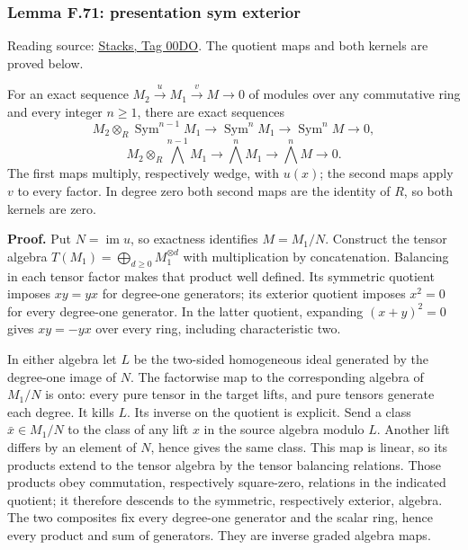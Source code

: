 \documentclass[11pt,a4paper,openany]{report}
\begin{document}
\label{AG-RG-S05-algebra-lemma-presentation-sym-exterior}

\subsubsection{Lemma F.71: presentation sym exterior}\label{AG-RG-S05-lemma-f.71-presentation-sym-exterior}

Reading source: \href{https://stacks.math.columbia.edu/tag/00DO}{Stacks, Tag 00DO}. The quotient maps and both kernels are proved below.

For an exact sequence \(M_2\xrightarrow{u}M_1\xrightarrow{v}M\to0\) of modules over any commutative ring and every integer \(n\geq1\), there are exact sequences \[
M_2\otimes_R\operatorname{Sym}^{n-1}M_1
\longrightarrow\operatorname{Sym}^nM_1
\longrightarrow\operatorname{Sym}^nM\longrightarrow0,
\] \[
M_2\otimes_R\bigwedge^{n-1}M_1
\longrightarrow\bigwedge^nM_1
\longrightarrow\bigwedge^nM\longrightarrow0.
\] The first maps multiply, respectively wedge, with \(u(x)\); the second maps apply \(v\) to every factor. In degree zero both second maps are the identity of \(R\), so both kernels are zero.

\textbf{Proof.} Put \(N=\operatorname{im}u\), so exactness identifies \(M=M_1/N\). Construct the tensor algebra \(T(M_1)=\bigoplus_{d\geq0}M_1^{\otimes d}\) with multiplication by concatenation. Balancing in each tensor factor makes that product well defined. Its symmetric quotient imposes \(xy=yx\) for degree-one generators; its exterior quotient imposes \(x^2=0\) for every degree-one generator. In the latter quotient, expanding \((x+y)^2=0\) gives \(xy=-yx\) over every ring, including characteristic two.

In either algebra let \(L\) be the two-sided homogeneous ideal generated by the degree-one image of \(N\). The factorwise map to the corresponding algebra of \(M_1/N\) is onto: every pure tensor in the target lifts, and pure tensors generate each degree. It kills \(L\). Its inverse on the quotient is explicit. Send a class \(\bar x\in M_1/N\) to the class of any lift \(x\) in the source algebra modulo \(L\). Another lift differs by an element of \(N\), hence gives the same class. This map is linear, so its products extend to the tensor algebra by the tensor balancing relations. Those products obey commutation, respectively square-zero, relations in the indicated quotient; it therefore descends to the symmetric, respectively exterior, algebra. The two composites fix every degree-one generator and the scalar ring, hence every product and sum of generators. They are inverse graded algebra maps.
\end{document}
